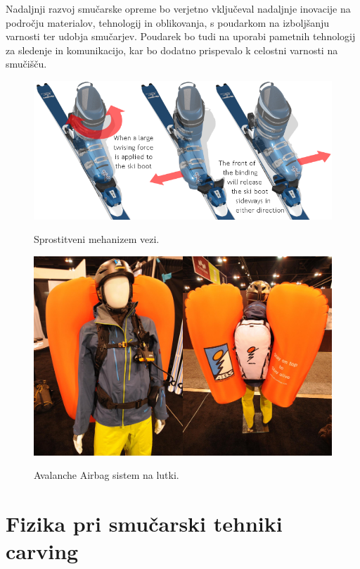 \documentclass{article}
\begin{document}
Nadaljnji razvoj smučarske opreme bo verjetno vključeval nadaljnje inovacije na področju materialov, tehnologij in oblikovanja, s poudarkom na izboljšanju varnosti ter udobja smučarjev. Poudarek bo tudi na uporabi pametnih tehnologij za sledenje in komunikacijo, kar bo dodatno prispevalo k celostni varnosti na smučišču.

\begin{figure}
    \centering
    \includegraphics[scale=2.5]{../images/bindings-toe-release.png} \\
    \caption[short]{Sprostitveni mehanizem vezi.}
\end{figure}

\begin{figure}
    \centering
    \includegraphics[scale=0.6]{../images/abs-bag_10.jpg} \\
    \caption[short]{Avalanche Airbag sistem na lutki.}
\end{figure}

\pagebreak

\section{Fizika pri smučarski tehniki carving}
\end{document}
